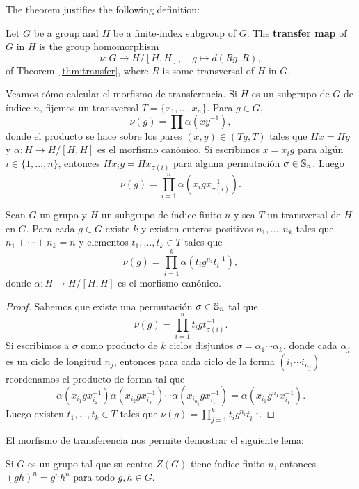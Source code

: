 The theorem justifies the following definition: 

\begin{definition}
	Let $G$ be a group and $H$ be a finite-index subgroup of $G$. The
	\textbf{transfer map} of $G$ in $H$ is the group homomorphism 
	\[
		\nu\colon G\to H/[H,H],
		\quad
		g\mapsto d(Rg,R),
	\]
	of Theorem~\ref{thm:transfer}, where $R$ is some transversal of $H$ in $G$.
\end{definition}

Veamos cómo calcular el morfismo de transferencia. Si $H$ es un subgrupo de $G$
de índice $n$, fijemos un transversal $T=\{x_1,\dots,x_n\}$. Para $g\in G$, 
\[
	\nu(g)=\prod \alpha(xy^{-1}),
\]
donde el producto se hace sobre los pares $(x,y)\in (Tg,T)$ tales que $Hx=Hy$
y $\alpha\colon H\to H/[H,H]$ es el morfismo canónico. 
Si escribimos
$x=x_ig$ para algún $i\in\{1,\dots,n\}$, entonces 
$Hx_ig=Hx_{\sigma(i)}$ para alguna permutación $\sigma\in\mathbb{S}_n$. Luego
\[
	\nu(g)=\prod_{i=1}^n\alpha(x_igx_{\sigma(i)}^{-1}).
\]

\begin{lemma}
	\label{lem:transfer}
	Sean $G$ un grupo y $H$ un subgrupo de índice finito $n$ y sea $T$ un
	transversal de $H$ en $G$.  Para cada $g\in G$ existe $k$ y existen
	enteros positivos $n_1,\dots,n_k$ tales que $n_1+\cdots+n_k=n$ y elementos
	$t_1,\dots,t_k\in T$ tales que 
	\[
		\nu(g)=\prod_{i=1}^k \alpha(t_ig^{n_i}t_i^{-1}),
	\]
	donde $\alpha\colon H\to H/[H,H]$ es el morfismo canónico. 
\end{lemma}

\begin{proof}
	Sabemos que existe una permutación $\sigma\in\mathbb{S}_n$ tal que 
	\[
	\nu(g)=\prod_{i=1}^n t_igt_{\sigma(i)}^{-1}. 
	\]
	Si escribimos a $\sigma$ como producto de $k$ ciclos disjuntos
	$\sigma=\alpha_1\cdots\alpha_k$, donde cada $\alpha_j$ es un ciclo de
	longitud $n_j$,  entonces para cada ciclo de la forma $(i_1\cdots i_{n_j})$
	reordenamos el producto de forma tal que
	\[
		\alpha(x_{i_1}gx_{i_2}^{-1})\alpha(x_{i_2}gx_{i_3}^{-1})\cdots \alpha(x_{i_{n_j}}gx_{i_1}^{-1})=\alpha(x_{i_1}g^{n_1}x_{i_1}^{-1}).
	\]
	Luego existen $t_1,\dots,t_k\in T$ tales que
	$\nu(g)=\prod_{j=1}^k t_ig^{n_i}t_i^{-1}$. 
\end{proof}

El morfismo de transferencia nos permite demostrar el siguiente
lema:

\begin{lemma}
	\label{lem:center}
	Si $G$ es un grupo tal que su centro $Z(G)$ tiene índice finito $n$, entonces
	$(gh)^n=g^nh^n$ para todo $g,h\in G$.	
\end{lemma}


